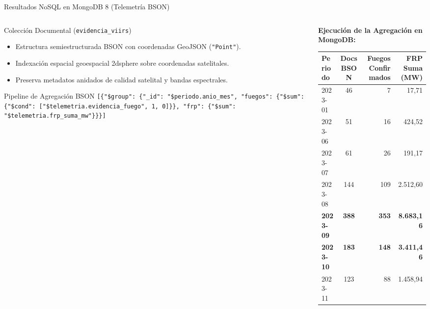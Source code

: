 \documentclass[aspectratio=169,11pt]{beamer}
\newcommand{\seccionactual}{Sustentaci\'on Final}
\begin{document}
\renewcommand{\seccionactual}{MongoDB}
\begin{frame}{Resultados NoSQL en MongoDB 8 (Telemetr\'ia BSON)}
  \begin{columns}
    \begin{column}{0.5\textwidth}
      \begin{block}{Colecci\'on Documental (\texttt{evidencia\_viirs})}\scriptsize
        \begin{itemize}
          \item Estructura semiestructurada BSON con coordenadas GeoJSON (\texttt{"Point"}).
          \item Indexaci\'on espacial geoespacial 2dsphere sobre coordenadas satelitales.
          \item Preserva metadatos anidados de calidad satelital y bandas espectrales.
        \end{itemize}
      \end{block}
      \begin{exampleblock}{Pipeline de Agregaci\'on BSON}\tiny
        \texttt{[\{"\$group": \{"\_id": "\$periodo.anio\_mes", "fuegos": \{"\$sum": \{"\$cond": ["\$telemetria.evidencia\_fuego", 1, 0]\}\}, "frp": \{"\$sum": "\$telemetria.frp\_suma\_mw"\}\}\}]}
      \end{exampleblock}
    \end{column}
    \begin{column}{0.5\textwidth}
      \scriptsize\textbf{Ejecuci\'on de la Agregaci\'on en MongoDB:}
      \begin{table}[H]
        \centering\tiny
        \begin{tabular}{@{}lcrr@{}}
          \toprule
          \textbf{Periodo} & \textbf{Docs BSON} & \textbf{Fuegos Confirmados} & \textbf{FRP Suma (MW)} \\
          \midrule
          2023-01 & 46  & 7   & 17,71 \\
          2023-06 & 51  & 16  & 424,52 \\
          2023-07 & 61  & 26  & 191,17 \\
          2023-08 & 144 & 109 & 2.512,60 \\
          \rowcolor{FuegoPalido}
          \textbf{2023-09} & \textbf{388} & \textbf{353} & \textbf{8.683,16} \\
          \rowcolor{FuegoPalido}
          \textbf{2023-10} & \textbf{183} & \textbf{148} & \textbf{3.411,46} \\
          2023-11 & 123 & 88  & 1.458,94 \\
          \bottomrule
        \end{tabular}
      \end{table}
    \end{column}
  \end{columns}
\end{frame}
\end{document}
